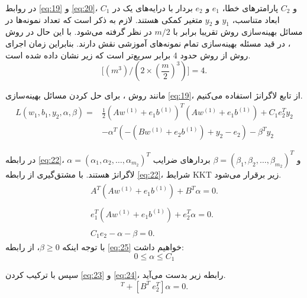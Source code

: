 \bigbreak
در روابط \ref{eq:19} و \ref{eq:20}،  $C_1$ و $C_2$  پارامترهای خطا،  $e_1$ و  $e_2$ بردار با درایه‌های یک در ابعاد متناسب،  $y_1$ و $y_2$  متغیر کمکی هستند. لازم به ذکر است که تعداد نمونه‌ها در مسائل بهینه‌سازی روش  تقریبا برابر با $m/2$ در نظر گرفته می‌شود. با این حال در روش ، در قید مسئله بهینه‌سازی تمام نمونه‌های آموزشی نقش دارند. بنابراین زمان اجرای روش  از روش  حدود 4 برابر سریع‌تر است که زیر نشان داده شده است.
\begin{equation}
\Big[({{m}^{3}})/(2\times {{(\frac{m}{2})}^{3}})\Big] = 4.
\label{eq:21}
\end{equation}

مانند روش ، برای حل کردن مسائل بهینه‌سازی \ref{eq:19}، از تابع لاگرانژ استفاده می‌کنیم.
\begin{equation}
\begin{split}
L(w_{1},b_{1},y_{2}, \alpha, \beta )= &\frac{1}{2}(A{{w}^{(1)}}+{{e}_{1}}{{b}^{(1)}})^{T}(A{{w}^{(1)}}+{{e}_{1}}{{b}^{(1)}}) + {{C}_{1}}e_{2}^{T}y_{2} \\
&-\alpha^{T}(-(Bw^{(1)}+e_{2}b^{(1)})+y_{2} - e_{2}) - \beta^{T}y_{2}
\end{split}
\label{eq:22}
\end{equation}

در رابطه \ref{eq:22}، $\alpha=(\alpha_{1}, \alpha_{2}, \dots,\alpha_{m_{2}})^{T}$ و $\beta=(\beta_{1}, \beta_{2}, \dots,\beta_{m_{2}})^{T}$ بردارهای ضرایب لاگرانژ هستند.  با مشتق‌گیری از رابطه \ref{eq:22}، شرایط \gls{KKT} زیر برقرار می‌شود.
\begin{align}
\label{eq:23}
\begin{split}
A^{T}(A{{w}^{(1)}}+{{e}_{1}}{{b}^{(1)}}) + B^{T}\alpha = 0.
\end{split} \\
\label{eq:24}
\begin{split}
e_{1}^{T}(A{{w}^{(1)}}+{{e}_{1}}{{b}^{(1)}}) + e_{2}^{T}\alpha = 0.
\end{split}\\
\label{eq:25}
\begin{split}
C_{1}e_{2} - \alpha - \beta = 0.
\end{split} 
\end{align}
با توجه اینکه $\beta \ge 0$، از رابطه \ref{eq:25} خواهیم داشت:
\begin{equation}
0 \le \alpha \le {C}_{1}
\label{eq:26}
\end{equation}

سپس با ترکیب کردن \ref{eq:23} و \ref{eq:24}، رابطه زیر بدست می‌آید.
\begin{equation}
[A^{T}\ e^{T}_{1}][A\ e_{1}][w^{(1)}\ b^{(1)}]^{T} + [B^{T}\ e^{T}_{2}]\alpha = 0.
\label{eq:27}
\end{equation}

